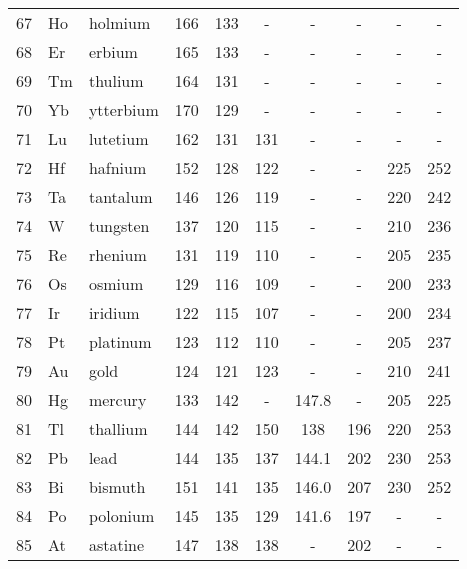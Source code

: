 \documentclass[   %
  final,          %
  a4paper,        %
  8pt
]{extarticle}
\begin{document}
\begin{ThreePartTable}
\begin{longtable}{rll*{7}{S[table-format=3.1, table-space-text-post = , table-align-text-post = false]}}
 67  & Ho   & holmium       & 166   & 133   & {-}   & {-}   & {-}          & {-}        & {-}     \\
 68  & Er   & erbium        & 165   & 133   & {-}   & {-}   & {-}          & {-}        & {-}     \\
 69  & Tm   & thulium       & 164   & 131   & {-}   & {-}   & {-}          & {-}        & {-}     \\
 70  & Yb   & ytterbium     & 170   & 129   & {-}   & {-}   & {-}          & {-}        & {-}     \\
 71  & Lu   & lutetium      & 162   & 131   & 131   & {-}   & {-}          & {-}        & {-}     \\
 72  & Hf   & hafnium       & 152   & 128   & 122   & {-}   & {-}          & 225        & 252     \\
 73  & Ta   & tantalum      & 146   & 126   & 119   & {-}   & {-}          & 220        & 242     \\
 74  & W    & tungsten      & 137   & 120   & 115   & {-}   & {-}          & 210        & 236     \\
 75  & Re   & rhenium       & 131   & 119   & 110   & {-}   & {-}          & 205        & 235     \\
 76  & Os   & osmium        & 129   & 116   & 109   & {-}   & {-}          & 200        & 233     \\
 77  & Ir   & iridium       & 122   & 115   & 107   & {-}   & {-}          & 200        & 234     \\
 78  & Pt   & platinum      & 123   & 112   & 110   & {-}   & {-}          & 205        & 237     \\
 79  & Au   & gold          & 124   & 121   & 123   & {-}   & {-}          & 210        & 241     \\
 80  & Hg   & mercury       & 133   & 142   & {-}   & 147.8 & {-}          & 205        & 225     \\
 81  & Tl   & thallium      & 144   & 142   & 150   & 138   & 196 & 220        & 253     \\
 82  & Pb   & lead          & 144   & 135   & 137   & 144.1 & 202 & 230        & 253     \\
 83  & Bi   & bismuth       & 151   & 141   & 135   & 146.0 & 207 & 230        & 252     \\
 84  & Po   & polonium      & 145   & 135   & 129   & 141.6 & 197 & {-}        & {-}     \\
 85  & At   & astatine      & 147   & 138   & 138   & {-}   & 202 & {-}        & {-}     \\

\end{longtable}
\end{ThreePartTable}
\end{document}
